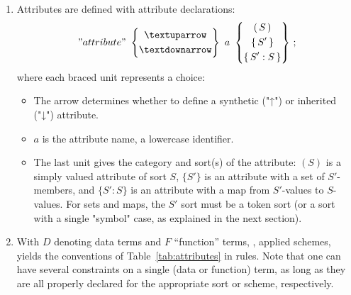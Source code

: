 \documentclass[11pt]{article} %
\begin{document}
\begin{notation}[attributes]\leavevmode
  \begin{enumerate}

  \item Attributes are defined with attribute declarations:
    \begin{displaymath}
      "attribute"
      ~
      \left\{
      \begin{gathered}
        {↑} \\
        {↓}
      \end{gathered}
      \right\}
      ~
      a
      ~
      \left\{
      \begin{gathered}
        (\,S\,) \\
        \{\,S'\,\} \\
        \{\,S' : S\,\}
      \end{gathered}
      \right\}
      \,;
    \end{displaymath}
    where each braced unit represents a choice:
    \begin{itemize}
    \item The arrow determines whether to define a synthetic ("↑") or inherited ("↓") attribute.
    \item $a$ is the attribute name, a lowercase identifier.
    \item The last unit gives the category and sort(s) of the attribute: $(S)$ is a simply valued
      attribute of sort $S$, $\{S'\}$ is an attribute with a set of $S'$-members, and $\{S':S\}$ is an
      attribute with a map from $S'$-values to $S$-values. For sets and maps, the $S'$ sort must be
      a token sort (or a sort with a single "symbol" case, as explained in the next section).
    \end{itemize}

  \item With $D$ denoting data terms and $F$ ``function'' terms, \ie, applied schemes, yields the
    conventions of Table~\ref{tab:attributes} in \HAX rules.  Note that one can have several
    constraints on a single (data or function) term, as long as they are all properly declared for
    the appropriate sort or scheme, respectively.

  \end{enumerate}
\end{notation}
\end{document}
